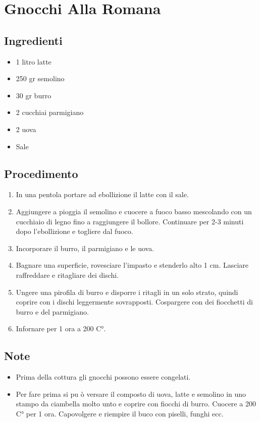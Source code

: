 \section{Gnocchi Alla Romana}
\subsection{Ingredienti}
\begin{itemize}
\item 1 litro latte  
\item 250 gr semolino  
\item 30 gr burro  
\item 2 cucchiai parmigiano  
\item 2 uova  
\item Sale
\end{itemize}
\subsection{Procedimento}
\begin{enumerate}
\item  In una pentola portare ad ebollizione il latte con il sale.  
\item  Aggiungere a pioggia il semolino e cuocere a fuoco basso mescolando con un cucchiaio di legno fino a raggiungere il bollore. Continuare per 2-3 minuti dopo l'ebollizione e togliere dal fuoco.  
\item  Incorporare il burro, il parmigiano e le uova.  
\item  Bagnare una superficie, rovesciare l'impasto e stenderlo alto 1 cm. Lasciare raffreddare e ritagliare dei dischi.  
\item  Ungere una pirofila di burro e disporre i ritagli in un solo strato, quindi coprire con i dischi leggermente sovrapposti. Cospargere con dei fiocchetti di burro e del parmigiano.  
\item  Infornare per 1 ora a 200 C°.
\end{enumerate}
\subsection{Note}
\begin{itemize}
\item Prima della cottura gli gnocchi possono essere congelati.  
\item Per fare prima si pu ò versare il composto di uova, latte e semolino in uno stampo da ciambella molto unto e coprire con fiocchi di burro. Cuocere a 200 C° per 1 ora. Capovolgere e riempire il buco con piselli, funghi ecc.
\end{itemize}
